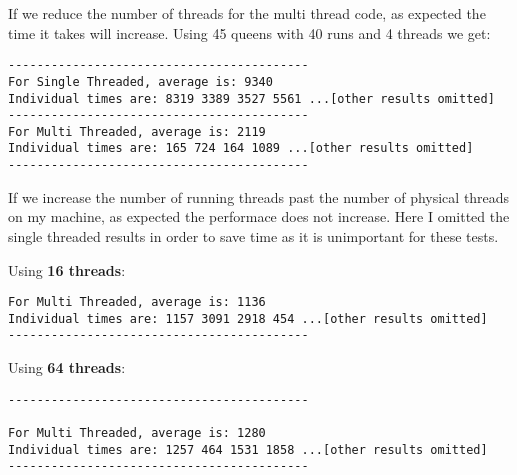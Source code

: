 \documentclass[12pt,letterpaper]{article} \usepackage{amsmath} \usepackage{graphicx} \usepackage[margin=1in]{geometry} \usepackage{longtable}  \usepackage{amssymb}
\begin{document}
	If we reduce the number of threads for the multi thread code, as expected the time it takes will increase. Using 45 queens with 40 runs and 4 threads we get:
	\begin{lstlisting}
------------------------------------------
For Single Threaded, average is: 9340
Individual times are: 8319 3389 3527 5561 ...[other results omitted]
------------------------------------------
For Multi Threaded, average is: 2119
Individual times are: 165 724 164 1089 ...[other results omitted]
------------------------------------------
	\end{lstlisting}

	If we increase the number of running threads past the number of physical threads on my machine, as expected the performace does not increase. Here I omitted the single threaded results in order to save time as it is unimportant for these tests. 
	
	Using \textbf{16 threads}:
	\begin{lstlisting}
For Multi Threaded, average is: 1136
Individual times are: 1157 3091 2918 454 ...[other results omitted]
------------------------------------------
	\end{lstlisting}

	Using \textbf{64 threads}:
	\begin{lstlisting}
------------------------------------------

For Multi Threaded, average is: 1280
Individual times are: 1257 464 1531 1858 ...[other results omitted]
------------------------------------------
	\end{lstlisting}
	
\end{document}
